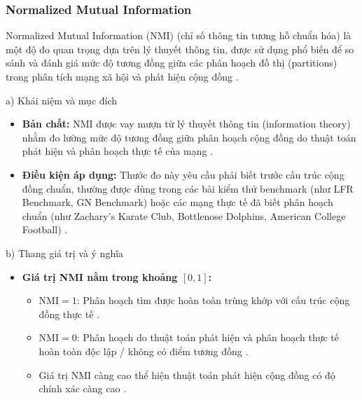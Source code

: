 \documentclass[14pt,a4paper]{extarticle}
\begin{document}
\subsubsection{Normalized Mutual Information}
Normalized Mutual Information (NMI) (chỉ số thông tin tương hỗ chuẩn hóa) là một độ đo quan trọng dựa trên lý thuyết thông tin, được sử dụng phổ biến để so sánh và đánh giá mức độ tương đồng giữa các phân hoạch đồ thị (partitions) trong phân tích mạng xã hội và phát hiện cộng đồng \cite{Traag2014}.

\noindent a) Khái niệm và mục đích
\begin{itemize}
    \item \textbf{Bản chất:} NMI được vay mượn từ lý thuyết thông tin (information theory) nhằm đo lường mức độ tương đồng giữa phân hoạch cộng đồng do thuật toán phát hiện và phân hoạch thực tế của mạng \cite{Baraa2021}.
    \item \textbf{Điều kiện áp dụng:} Thước đo này yêu cầu phải biết trước cấu trúc cộng đồng chuẩn, thường được dùng trong các bài kiểm thử benchmark (như LFR Benchmark, GN Benchmark) hoặc các mạng thực tế đã biết phân hoạch chuẩn (như Zachary's Karate Club, Bottlenose Dolphins, American College Football) \cite{Baraa2021}.
\end{itemize}

\noindent b) Thang giá trị và ý nghĩa
\begin{itemize}
    \item \textbf{Giá trị NMI nằm trong khoảng $[0, 1]$:}
    \begin{itemize}
        \item $\text{NMI} = 1$: Phân hoạch tìm được hoàn toàn trùng khớp với cấu trúc cộng đồng thực tế \cite{Gong2012Memetic}.
        \item $\text{NMI} = 0$: Phân hoạch do thuật toán phát hiện và phân hoạch thực tế hoàn toàn độc lập / không có điểm tương đồng \cite{Gong2012Memetic}.
        \item Giá trị NMI càng cao thể hiện thuật toán phát hiện cộng đồng có độ chính xác càng cao \cite{Baraa2021}.
    \end{itemize}
\end{itemize}
\end{document}
